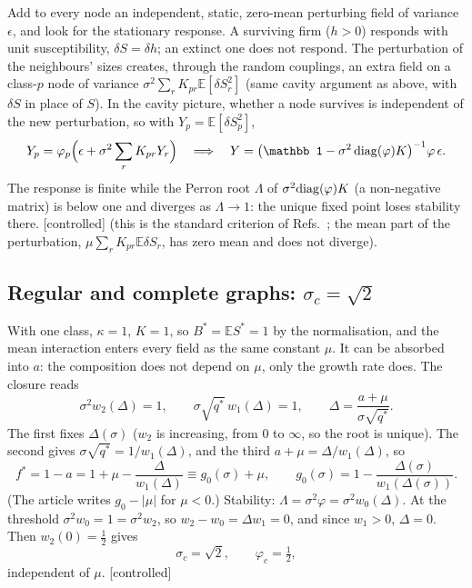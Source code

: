 \documentclass[11pt]{article}
\newcommand{\E}{\mathbb E}
\newcommand{\controlled}{\textsf{\small[controlled]}}
\begin{document}
Add to every node an independent, static, zero-mean perturbing field of variance $\epsilon$, and look for
the stationary response.  A surviving firm ($h>0$) responds with unit susceptibility, $\delta S=\delta h$; an
extinct one does not respond.  The perturbation of the neighbours' sizes creates, through the random
couplings, an extra field on a class-$p$ node of variance $\sigma^2\sum_rK_{pr}\E[\delta S_r^2]$ (same cavity
argument as above, with $\delta S$ in place of $S$).  In the cavity picture, whether a node survives is
independent of the new perturbation, so with $Y_p=\E[\delta S_p^2]$,
\begin{equation}
Y_p=\varphi_p\Big(\epsilon+\sigma^2\sum_rK_{pr}Y_r\Big)\quad\Longrightarrow\quad
Y=\big(\mathbb 1-\sigma^2\,{\rm diag}(\varphi)K\big)^{-1}\varphi\,\epsilon .
\end{equation}
The response is finite while the Perron root $\Lambda$ of $\sigma^2{\rm diag}(\varphi)K$ (a non-negative matrix) is
below one and diverges as $\Lambda\to1$: the unique fixed point loses stability there.  \controlled{} (this
is the standard criterion of Refs.~\cite{opperdiederich1992,bunin2017,roy2020}; the mean part of the
perturbation, $\mu\sum_rK_{pr}\E\delta S_r$, has zero mean and does not diverge).

\subsection{Regular and complete graphs: $\sigma_c=\sqrt2$}

With one class, $\kappa=1$, $K=1$, so $B^*=\E S^*=1$ by the normalisation, and the mean interaction enters
every field as the same constant $\mu$.  It can be absorbed into $a$: the composition does not depend on
$\mu$, only the growth rate does.  The closure reads
\begin{equation}
\sigma^2w_2(\Delta)=1,\qquad \sigma\sqrt{q^*}\,w_1(\Delta)=1,\qquad \Delta=\frac{a+\mu}{\sigma\sqrt{q^*}} .
\end{equation}
The first fixes $\Delta(\sigma)$ ($w_2$ is increasing, from $0$ to $\infty$, so the root is unique).  The second
gives $\sigma\sqrt{q^*}=1/w_1(\Delta)$, and the third $a+\mu=\Delta/w_1(\Delta)$, so
\begin{equation}
f^*=1-a=1+\mu-\frac{\Delta}{w_1(\Delta)}\equiv g_0(\sigma)+\mu,\qquad g_0(\sigma)=1-\frac{\Delta(\sigma)}{w_1(\Delta(\sigma))} .
\end{equation}
(The article writes $g_0-|\mu|$ for $\mu<0$.)  Stability: $\Lambda=\sigma^2\varphi=\sigma^2w_0(\Delta)$.  At the threshold
$\sigma^2w_0=1=\sigma^2w_2$, so $w_2-w_0=\Delta w_1=0$, and since $w_1>0$, $\Delta=0$.  Then $w_2(0)=\tfrac12$ gives
\begin{equation}
\boxed{\sigma_c=\sqrt2,\qquad \varphi_c=\tfrac12,}
\end{equation}
independent of $\mu$.  \controlled
\end{document}
